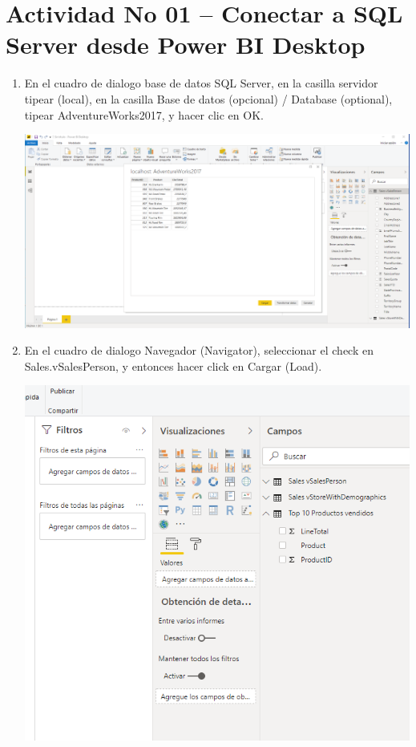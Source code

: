 \section{Actividad No 01 – Conectar a SQL Server desde Power BI Desktop} 



\begin{enumerate}[1.]
	\item  En el cuadro de dialogo base de datos SQL Server, en la casilla servidor tipear (local), en la casilla Base de datos (opcional) / Database (optional), tipear AdventureWorks2017, y hacer clic en OK.
	

	\begin{center}
	\includegraphics[width=16cm]{./Imagenes/Imagen1} 
	\end{center}

	\clearpage
	\item  En el cuadro de dialogo Navegador (Navigator), seleccionar el check en Sales.vSalesPerson, y entonces hacer click en Cargar (Load).

	\begin{center}
	\includegraphics[width=16cm]{./Imagenes/Imagen2} 
	\end{center}


\end{enumerate}
